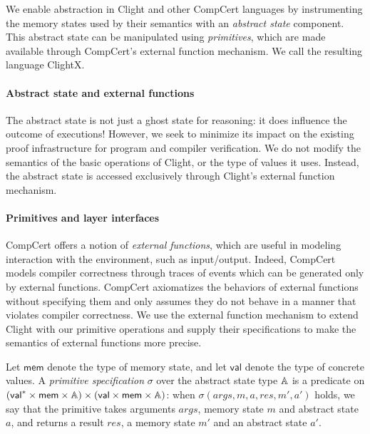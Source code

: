 We enable abstraction in Clight and other CompCert languages
by instrumenting the memory states used by their semantics
with an \emph{abstract state} component.
This abstract state can be manipulated using \emph{primitives},
which are made available through CompCert's external function mechanism.
We call the resulting language ClightX.

\paragraph{Abstract state and external functions}
The abstract state is not just a ghost state for reasoning: it
does influence the outcome of executions!  However, we seek to
minimize its impact on the existing proof
infrastructure for program and compiler verification.
We do not modify the semantics of the basic operations of
Clight, or the type of values it uses.  Instead, the abstract state is
accessed exclusively through Clight's external function mechanism.

\paragraph{Primitives and layer interfaces}
CompCert offers a notion of \emph{external functions}, which are
useful in modeling interaction with the environment, such as
input/output. Indeed, CompCert models compiler correctness through
traces of events which can be generated only by external functions.
CompCert axiomatizes the behaviors of external functions without
specifying them and only assumes they do not behave in a manner that
violates compiler correctness. We use the external function mechanism
to extend Clight with our primitive operations and supply their
specifications to make the semantics of external functions more
precise.

\begin{definition} \label{def:c-prim}
Let $\textsf{mem}$ denote the type of memory state, and
let $\textsf{val}$ denote the type of concrete values.
A \emph{primitive specification} $\sigma$ over the abstract state type $\mathbb{A}$
is a predicate on $(\textsf{val}^* \times \textsf{mem} \times \mathbb{A}) \times
(\textsf{val} \times \textsf{mem} \times
\mathbb{A})$: when $\sigma(\mathit{args}, m, a, \mathit{res}, m', a')$ holds, we say
that the primitive takes arguments $\mathit{args}$, memory state
$m$ and abstract state $a$, and returns a result $\mathit{res}$, a
memory state $m'$ and an abstract state $a'$.
\end{definition}

